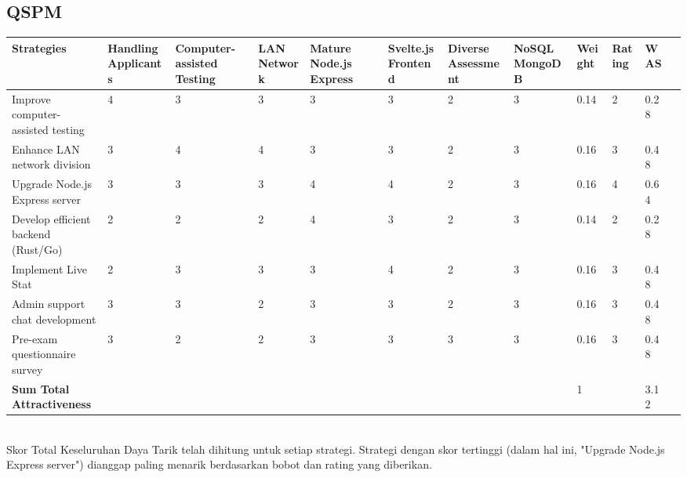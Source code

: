 \documentclass[12pt]{article}
\begin{document}


\begin{landscape}
  \subsection*{QSPM}
  \begin{tabular}{|p{3cm}|p{2cm} |p{2cm}|p{2cm}|p{2cm}|p{2cm}|p{2cm}|p{2cm}|p{2cm}|p{2cm}|p{1cm}|p{1cm}|}
    \hline
    \textbf{Strategies} & \textbf{Handling Applicants} & \textbf{Computer-assisted Testing} & \textbf{LAN Network} & \textbf{Mature Node.js Express} & \textbf{Svelte.js Frontend} & \textbf{Diverse Assessment} & \textbf{NoSQL MongoDB} & \textbf{Weight} & \textbf{Rating} & \textbf{WAS} \\
    \hline
    Improve computer-assisted testing & 4 & 3 & 3 & 3 & 3 & 2 & 3 & 0.14 & 2 & 0.28 \\
    Enhance LAN network division & 3 & 4 & 4 & 3 & 3 & 2 & 3 & 0.16 & 3 & 0.48 \\
    Upgrade Node.js Express server & 3 & 3 & 3 & 4 & 4 & 2 & 3 & 0.16 & 4 & 0.64 \\
    Develop efficient backend (Rust/Go) & 2 & 2 & 2 & 4 & 3 & 2 & 3 & 0.14 & 2 & 0.28 \\
    Implement Live Stat & 2 & 3 & 3 & 3 & 4 & 2 & 3 & 0.16 & 3 & 0.48 \\
    Admin support chat development & 3 & 3 & 2 & 3 & 3 & 2 & 3 & 0.16 & 3 & 0.48 \\
    Pre-exam questionnaire survey & 3 & 2 & 2 & 3 & 3 & 3 & 3 & 0.16 & 3 & 0.48 \\
    \hline
    \textbf{Sum Total Attractiveness} & & & & & & & & 1 & & 3.12 \\
    \hline
    \end{tabular}
    \\
    Skor Total Keseluruhan Daya Tarik telah dihitung untuk setiap strategi. Strategi dengan skor tertinggi (dalam hal ini, "Upgrade Node.js Express server") dianggap paling menarik berdasarkan bobot dan rating yang diberikan.
  

  
\end{landscape}  
\printbibliography[title=Daftar Pustaka]
\end{document}
